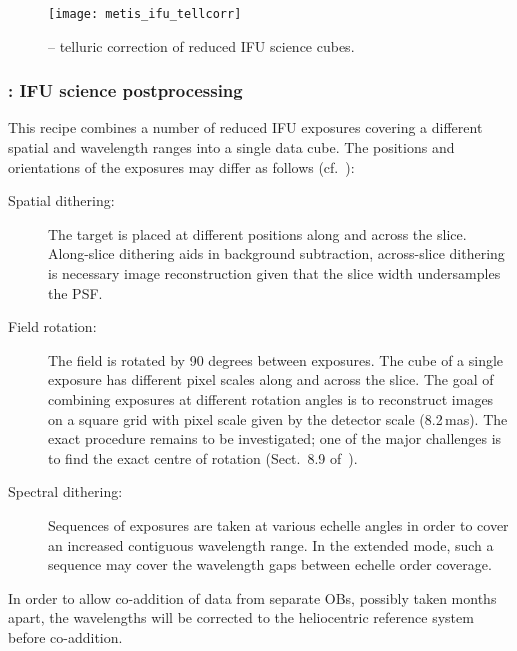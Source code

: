 \begin{figure}[hb]
  \centering
  \texttt{[image: metis\_ifu\_tellcorr]}
  \caption[Recipe: ]{
    -- telluric correction of reduced IFU science cubes.}
  \label{fig:metis_ifu_tellcorr}
\end{figure}


\clearpage
\subsubsection{: IFU science postprocessing}
\label{sssec:ifu_sci_postprocess}
\label{rec:metis_ifu_sci_postprocess}

This recipe combines a number of reduced IFU exposures covering a
different spatial and wavelength ranges into a single data cube. The
positions and orientations of the exposures may differ as follows (cf.~\cite{METIS-operational_concept}): %
\begin{description}
\item[Spatial dithering:] The target is placed at different positions
  along and across the slice. Along-slice dithering aids in background
  subtraction, across-slice dithering is necessary image
  reconstruction given that the slice width undersamples the PSF\@.
\item[Field rotation:] The field is rotated by 90 degrees between
  exposures. The cube of a single exposure has different pixel scales
  along and across the slice. The goal of combining exposures at
  different rotation angles is to reconstruct images on a square grid
  with pixel scale given by the detector scale (8.2\,mas). The exact
  procedure remains to be investigated; one of the major challenges is
  to find the exact centre of rotation
  (Sect.~8.9 of~\cite{DRLS}).
\item[Spectral dithering:] Sequences of exposures are taken at various
  echelle angles in order to cover an increased contiguous wavelength
  range. In the extended mode, such a sequence may cover the
  wavelength gaps between echelle order coverage.
\end{description}

In order to allow co-addition of data from separate OBs, possibly taken
months apart, the wavelengths will be corrected to the heliocentric
reference system before co-addition.

